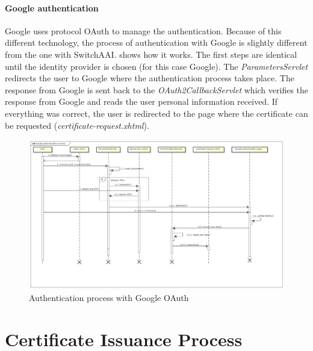 \documentclass[oneside]{scrreprt}
\begin{document}
\paragraph*{Google authentication} Google uses protocol OAuth to manage the authentication. Because of this different technology, the process of authentication with Google is slightly different from the one with SwitchAAI.  shows how it works. The first steps are identical until the identity provider is chosen (for this case Google). The \textit{ParametersServlet} redirects the user to Google where the authentication process takes place. The response from Google is sent back to the \textit{OAuth2CallbackServlet} which verifies the response from Google and reads the user personal information received. If everything was correct, the user is redirected to the page where the certificate can be requested (\textit{certificate-request.xhtml}).
\begin{figure}[ht]
\centerline{
\includegraphics[width=1.0\textwidth]{figs/authentication_process_google}}
\caption{Authentication process with Google OAuth}
\label{fig:auth_process_google}
\end{figure}

\section{Certificate Issuance Process} \label{sec:issuance_process}
\end{document}
